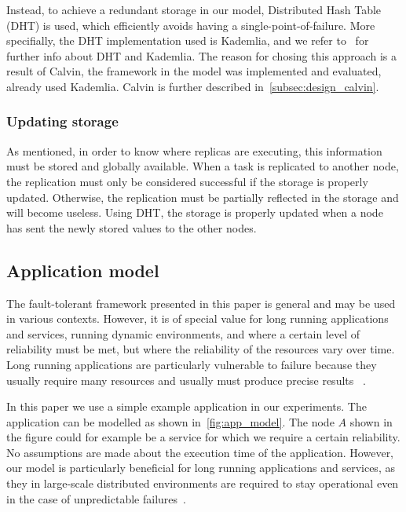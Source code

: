 \documentclass{cslthse-msc}
\begin{document}
Instead, to achieve a redundant storage in our model, Distributed Hash Table (DHT) is used, which efficiently avoids having a single-point-of-failure. More specifially, the DHT implementation used is Kademlia, and we refer to~\cite{kademlia} for further info about DHT and Kademlia. The reason for chosing this approach is a result of Calvin, the framework in the model was implemented and evaluated, already used Kademlia. Calvin is further described in~\cref{subsec:design_calvin}.

\subsubsection{Updating storage}
As mentioned, in order to know where replicas are executing, this information must be stored and globally available. When a task is replicated to another node, the replication must only be considered successful if the storage is properly updated. Otherwise, the replication must be partially reflected in the storage and will become useless. Using DHT, the storage is properly updated when a node has sent the newly stored values to the other nodes. 

\subsection{Application model} \label{subsec:design_app_model}
The fault-tolerant framework presented in this paper is general and may be used in various contexts. However, it is of special value for long running applications and services, running dynamic environments, and where a certain level of reliability must be met, but where the reliability of the resources vary over time. Long running applications are particularly vulnerable to failure because they usually require many resources and usually must produce precise results ~\cite{relGridSystems}.

In this paper we use a simple example application in our experiments. The application can be modelled as shown in~\cref{fig:app_model}. The node $A$ shown in the figure could for example be a service for which we require a certain reliability. No assumptions are made about the execution time of the application. However, our model is particularly beneficial for long running applications and services, as they in large-scale distributed environments are required to stay operational even in the case of unpredictable failures~\cite{imprRelAdaptRL}.
\end{document}
